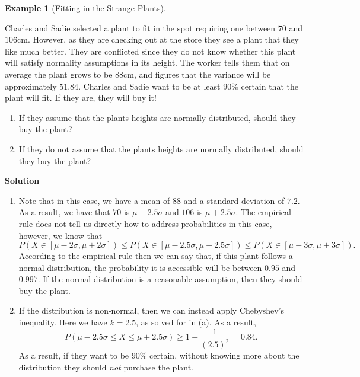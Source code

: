 \documentclass[
  letterpaper,
  DIV=11,
  numbers=noendperiod]{scrreprt}
\providecommand{\tightlist}{%
  \setlength{\itemsep}{0pt}\setlength{\parskip}{0pt}}\usepackage{longtable,booktabs,array}
\theoremstyle{definition}
\theoremstyle{definition}
\newtheorem{example}{Example}[chapter]
\theoremstyle{definition}
\theoremstyle{remark}
\begin{document}
\begin{example}[Fitting in the Strange
Plants]\protect\hypertarget{exm-chebyshevs-ineqaulity}{}\label{exm-chebyshevs-ineqaulity}

Charles and Sadie selected a plant to fit in the spot requiring one
between \(70\) and \(106\)cm. However, as they are checking out at the
store they see a plant that they like much better. They are conflicted
since they do not know whether this plant will satisfy normality
assumptions in its height. The worker tells them that on average the
plant grows to be \(88\)cm, and figures that the variance will be
approximately \(51.84\). Charles and Sadie want to be at least \(90\%\)
certain that the plant will fit. If they are, they will buy it!

\begin{enumerate}
\def\labelenumi{\alph{enumi}.}
\tightlist
\item
  If they assume that the plants heights are normally distributed,
  should they buy the plant?
\item
  If they do not assume that the plants heights are normally
  distributed, should they buy the plant?
\end{enumerate}

\begin{tcolorbox}[enhanced jigsaw, colback=white, colframe=quarto-callout-color-frame, arc=.35mm, leftrule=.75mm, rightrule=.15mm, opacityback=0, breakable, bottomrule=.15mm, left=2mm, toprule=.15mm]

\vspace{-3mm}\textbf{Solution}\vspace{3mm}

\begin{enumerate}
\def\labelenumi{\alph{enumi}.}
\tightlist
\item
  Note that in this case, we have a mean of \(88\) and a standard
  deviation of \(7.2\). As a result, we have that \(70\) is
  \(\mu - 2.5\sigma\) and \(106\) is \(\mu + 2.5\sigma\). The empirical
  rule does not tell us directly how to address probabilities in this
  case, however, we know that
  \[P(X \in [\mu-2\sigma, \mu+2\sigma]) \leq P(X \in [\mu - 2.5\sigma, \mu+2.5\sigma]) \leq P(X \in [\mu-3\sigma,\mu+3\sigma]).\]
  According to the empirical rule then we can say that, if this plant
  follows a normal distribution, the probability it is accessible will
  be between \(0.95\) and \(0.997\). If the normal distribution is a
  reasonable assumption, then they should buy the plant.
\item
  If the distribution is non-normal, then we can instead apply
  Chebyshev's inequality. Here we have \(k=2.5\), as solved for in (a).
  As a result,
  \[P(\mu - 2.5\sigma \leq X \leq \mu + 2.5\sigma) \geq 1 - \frac{1}{(2.5)^2} = 0.84.\]
  As a result, if they want to be \(90\%\) certain, without knowing more
  about the distribution they should \emph{not} purchase the plant.
\end{enumerate}

\end{tcolorbox}

\end{example}
\end{document}
